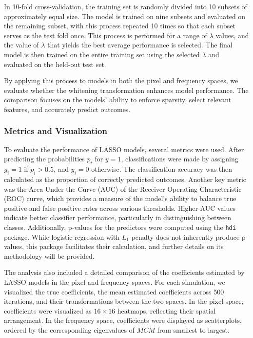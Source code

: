 \documentclass[12pt]{article}
\begin{document}
In 10-fold cross-validation, the training set is randomly divided into 10 subsets of approximately equal size. The model is trained on nine subsets and evaluated on the remaining subset, with this process repeated 10 times so that each subset serves as the test fold once. This process is performed for a range of \( \lambda \) values, and the value of \( \lambda \) that yields the best average performance is selected. The final model is then trained on the entire training set using the selected \( \lambda \) and evaluated on the held-out test set.

By applying this process to models in both the pixel and frequency spaces, we evaluate whether the whitening transformation enhances model performance. The comparison focuses on the models’ ability to enforce sparsity, select relevant features, and accurately predict outcomes.


\subsubsection{Metrics and Visualization}

To evaluate the performance of LASSO models, several metrics were used. After predicting the probabilities \( p_i \) for \( y = 1 \), classifications were made by assigning \( y_i = 1 \) if \( p_i > 0.5 \), and \( y_i = 0 \) otherwise. The classification accuracy was then calculated as the proportion of correctly predicted outcomes. Another key metric was the Area Under the Curve (AUC) of the Receiver Operating Characteristic (ROC) curve, which provides a measure of the model’s ability to balance true positive and false positive rates across various thresholds. Higher AUC values indicate better classifier performance, particularly in distinguishing between classes. Additionally, p-values for the predictors were computed using the \texttt{hdi} package. While logistic regression with \( L_1 \) penalty does not inherently produce p-values, this package facilitates their calculation, and further details on its methodology will be provided.

The analysis also included a detailed comparison of the coefficients estimated by LASSO models in the pixel and frequency spaces. For each simulation, we visualized the true coefficients, the mean estimated coefficients across 500 iterations, and their transformations between the two spaces. In the pixel space, coefficients were visualized as \( 16 \times 16 \) heatmaps, reflecting their spatial arrangement. In the frequency space, coefficients were displayed as scatterplots, ordered by the corresponding eigenvalues of \( MCM \) from smallest to largest. 
\end{document}
